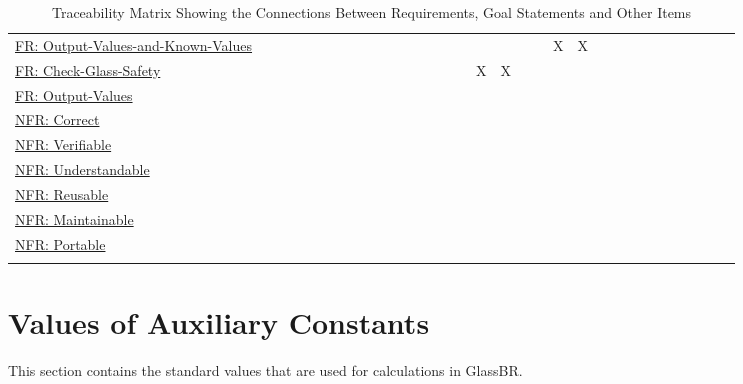 \documentclass[12pt]{article}
\begin{document}
\begin{longtable}{l l l l l l l l l l l l l l l l l l l l l l l l l l l l l l l l}
\\
\hyperref[outputValsAndKnownValues]{FR: Output-Values-and-Known-Values} &  &  &  &  &  &  &  &  &  &  &  &  &  &  &  &  &  &  &  & X & X &  &  &  &  &  &  &  &  &  & 
\\
\hyperref[checkGlassSafety]{FR: Check-Glass-Safety} &  &  &  &  &  &  &  &  &  &  &  &  &  &  &  & X & X &  &  &  &  &  &  &  &  &  &  &  &  &  & 
\\
\hyperref[outputValues]{FR: Output-Values} &  &  &  &  &  &  &  &  &  &  &  &  &  &  &  &  &  &  &  &  &  &  &  &  &  &  &  &  &  &  & 
\\
\hyperref[correct]{NFR: Correct} &  &  &  &  &  &  &  &  &  &  &  &  &  &  &  &  &  &  &  &  &  &  &  &  &  &  &  &  &  &  & 
\\
\hyperref[verifiable]{NFR: Verifiable} &  &  &  &  &  &  &  &  &  &  &  &  &  &  &  &  &  &  &  &  &  &  &  &  &  &  &  &  &  &  & 
\\
\hyperref[understandable]{NFR: Understandable} &  &  &  &  &  &  &  &  &  &  &  &  &  &  &  &  &  &  &  &  &  &  &  &  &  &  &  &  &  &  & 
\\
\hyperref[reusable]{NFR: Reusable} &  &  &  &  &  &  &  &  &  &  &  &  &  &  &  &  &  &  &  &  &  &  &  &  &  &  &  &  &  &  & 
\\
\hyperref[maintainable]{NFR: Maintainable} &  &  &  &  &  &  &  &  &  &  &  &  &  &  &  &  &  &  &  &  &  &  &  &  &  &  &  &  &  &  & 
\\
\hyperref[portable]{NFR: Portable} &  &  &  &  &  &  &  &  &  &  &  &  &  &  &  &  &  &  &  &  &  &  &  &  &  &  &  &  &  &  & 
\\
\bottomrule
\caption{Traceability Matrix Showing the Connections Between Requirements, Goal Statements and Other Items}
\label{Table:TraceMatAllvsR}
\end{longtable}
\section{Values of Auxiliary Constants}
\label{Sec:AuxConstants}
This section contains the standard values that are used for calculations in GlassBR.
\end{document}
